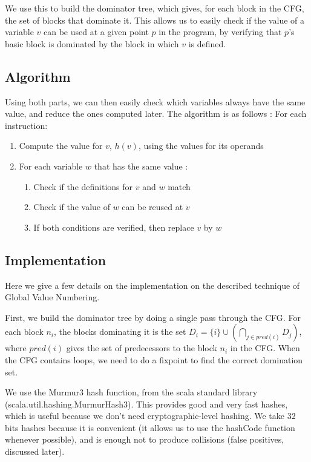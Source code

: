 \documentclass[12pt,a4paper]{article}
\newcommand{\scala}[1]{\textsf{#1}}
\begin{document}
We use this to build the dominator tree, which gives, for each block in the CFG, the set of blocks that dominate it. This allows us to easily check if the value of a variable $v$ can be used at a given point $p$ in the program, by verifying that $p$'s basic block is dominated by the block in which $v$ is defined.

\subsection{Algorithm}

Using both parts, we can then easily check which variables always have the same value, and reduce the ones computed later. The algorithm is as follows : \newline
For each instruction:
\begin{enumerate}
\item Compute the value for $v$, $h(v)$, using the values for its operands
\item For each variable $w$ that has the same value :
	\begin{enumerate}
	\item Check if the definitions for $v$ and $w$ match
	\item Check if the value of $w$ can be reused at $v$
	\item If both conditions are verified, then replace $v$ by $w$
	\end{enumerate}
\end{enumerate}

\subsection{Implementation}

Here we give a few details on the implementation on the described technique of Global Value Numbering.

First, we build the dominator tree by doing a single pass through the CFG. For each block $n_i$, the blocks dominating it is the set $D_i = \{i\} \cup \left( \bigcap\limits_{j \in pred(i)} D_j \right)$, where $pred(i)$ gives the set of predecessors to the block $n_i$ in the CFG. When the CFG contains loops, we need to do a fixpoint to find the correct domination set.

We use the \textsf{Murmur3} hash function, from the scala standard library (\scala{scala.util.hashing.MurmurHash3}). This provides good and very fast hashes, which is useful because we don't need cryptographic-level hashing. We take 32 bits hashes because it is convenient (it allows us to use the \scala{hashCode} function whenever possible), and is enough not to produce collisions (false positives, discussed later).
\end{document}
